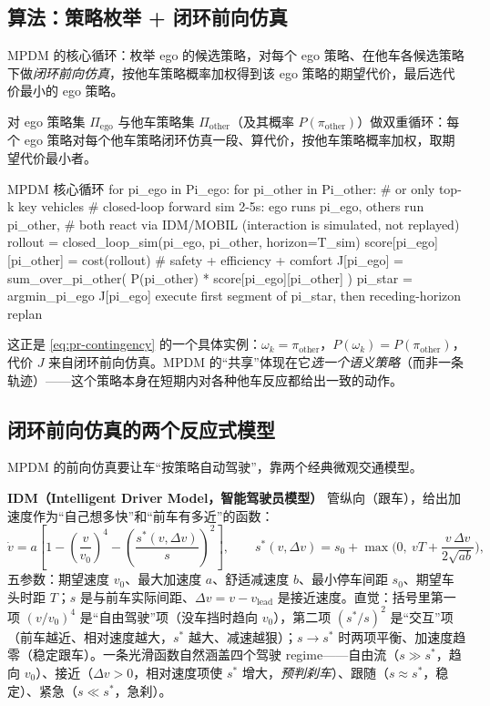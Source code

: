 \subsection{算法：策略枚举 + 闭环前向仿真}
\label{sec:pr-mpdm-algo}

MPDM 的核心循环：枚举 ego 的候选策略，对每个 ego 策略、在他车各候选策略下做\emph{闭环前向仿真}，按他车策略概率加权得到该 ego 策略的期望代价，最后选代价最小的 ego 策略\cite{cunningham2015mpdm}。

\begin{algo}\label{alg:pr-mpdm}
对 ego 策略集 $\Pi_{\mathrm{ego}}$ 与他车策略集 $\Pi_{\mathrm{other}}$（及其概率 $P(\pi_{\mathrm{other}})$）做双重循环：每个 ego 策略对每个他车策略闭环仿真一段、算代价，按他车策略概率加权，取期望代价最小者。
\end{algo}

\begin{codebox}[text]{MPDM 核心循环}
for pi_ego in Pi_ego:
    for pi_other in Pi_other:          # or only top-k key vehicles
        # closed-loop forward sim 2-5s: ego runs pi_ego, others run pi_other,
        # both react via IDM/MOBIL (interaction is simulated, not replayed)
        rollout = closed_loop_sim(pi_ego, pi_other, horizon=T_sim)
        score[pi_ego][pi_other] = cost(rollout)   # safety + efficiency + comfort
    J[pi_ego] = sum_over_pi_other( P(pi_other) * score[pi_ego][pi_other] )
pi_star = argmin_{pi_ego} J[pi_ego]
execute first segment of pi_star, then receding-horizon replan
\end{codebox}

这正是 \cref{eq:pr-contingency} 的一个具体实例：$\omega_k=\pi_{\mathrm{other}}$，$P(\omega_k)=P(\pi_{\mathrm{other}})$，代价 $J$ 来自闭环前向仿真。MPDM 的“共享”体现在它\emph{选一个语义策略}（而非一条轨迹）——这个策略本身在短期内对各种他车反应都给出一致的动作。

\subsection{闭环前向仿真的两个反应式模型}
\label{sec:pr-mpdm-models}

MPDM 的前向仿真要让车“按策略自动驾驶”，靠两个经典微观交通模型。

\textbf{IDM（Intelligent Driver Model，智能驾驶员模型）}\cite{treiber2000idm} 管纵向（跟车），给出加速度作为“自己想多快”和“前车有多近”的函数：
\begin{equation}
  \dot v = a\left[1-\left(\frac{v}{v_0}\right)^{4}-\left(\frac{s^*(v,\Delta v)}{s}\right)^{2}\right],
  \qquad
  s^*(v,\Delta v)=s_0+\max\!\Big(0,\ vT+\frac{v\,\Delta v}{2\sqrt{ab}}\Big),
  \label{eq:pr-idm}
\end{equation}
五参数：期望速度 $v_0$、最大加速度 $a$、舒适减速度 $b$、最小停车间距 $s_0$、期望车头时距 $T$；$s$ 是与前车实际间距、$\Delta v=v-v_{\mathrm{lead}}$ 是接近速度。直觉：括号里第一项 $(v/v_0)^4$ 是“自由驾驶”项（没车挡时趋向 $v_0$），第二项 $(s^*/s)^2$ 是“交互”项（前车越近、相对速度越大，$s^*$ 越大、减速越狠）；$s\to s^*$ 时两项平衡、加速度趋零（稳定跟车）。一条光滑函数自然涵盖四个驾驶 regime——自由流（$s\gg s^*$，趋向 $v_0$）、接近（$\Delta v>0$，相对速度项使 $s^*$ 增大，\emph{预判刹车}）、跟随（$s\approx s^*$，稳定）、紧急（$s\ll s^*$，急刹）。

